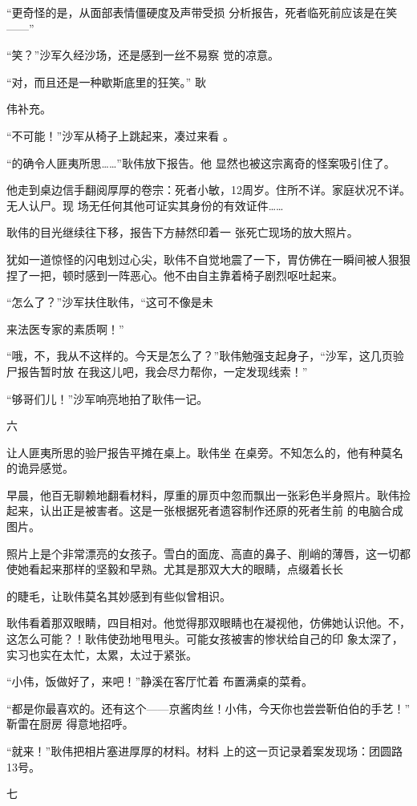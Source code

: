 \documentclass{article}
\begin{document}
“更奇怪的是，从面部表情僵硬度及声带受损
分析报告，死者临死前应该是在笑——” 

“笑？”沙军久经沙场，还是感到一丝不易察
觉的凉意。 

“对，而且还是一种歇斯底里的狂笑。” 耿

\newpage
伟补充。 

“不可能！”沙军从椅子上跳起来，凑过来看
。 

“的确令人匪夷所思……”耿伟放下报告。他
显然也被这宗离奇的怪案吸引住了。 

他走到桌边信手翻阅厚厚的卷宗：死者小敏，12周岁。住所不详。家庭状况不详。无人认尸。现
场无任何其他可证实其身份的有效证件…… 

耿伟的目光继续往下移，报告下方赫然印着一
张死亡现场的放大照片。 

犹如一道惊怪的闪电划过心尖，耿伟不自觉地震了一下，胃仿佛在一瞬间被人狠狠捏了一把，顿时感到一阵恶心。他不由自主靠着椅子剧烈呕吐起来。
 

“怎么了？”沙军扶住耿伟，“这可不像是未

\newpage
来法医专家的素质啊！” 

“哦，不，我从不这样的。今天是怎么了？”耿伟勉强支起身子，“沙军，这几页验尸报告暂时放
在我这儿吧，我会尽力帮你，一定发现线索！” 


“够哥们儿！”沙军响亮地拍了耿伟一记。 


六 

让人匪夷所思的验尸报告平摊在桌上。耿伟坐
在桌旁。不知怎么的，他有种莫名的诡异感觉。 

早晨，他百无聊赖地翻看材料，厚重的扉页中忽而飘出一张彩色半身照片。耿伟捡起来，认出正是被害者。这是一张根据死者遗容制作还原的死者生前
的电脑合成图片。 

照片上是个非常漂亮的女孩子。雪白的面庞、高直的鼻子、削峭的薄唇，这一切都使她看起来那样的坚毅和早熟。尤其是那双大大的眼睛，点缀着长长

\newpage
的睫毛，让耿伟莫名其妙感到有些似曾相识。 

耿伟看着那双眼睛，四目相对。他觉得那双眼睛也在凝视他，仿佛她认识他。不，这怎么可能？！耿伟使劲地甩甩头。可能女孩被害的惨状给自己的印
象太深了，实习也实在太忙，太累，太过于紧张。 

“小伟，饭做好了，来吧！”静溪在客厅忙着
布置满桌的菜肴。 

“都是你最喜欢的。还有这个——京酱肉丝！小伟，今天你也尝尝靳伯伯的手艺！” 靳雷在厨房
得意地招呼。 

“就来！”耿伟把相片塞进厚厚的材料。材料
上的这一页记录着案发现场：团圆路13号。 


七 
\end{document}
